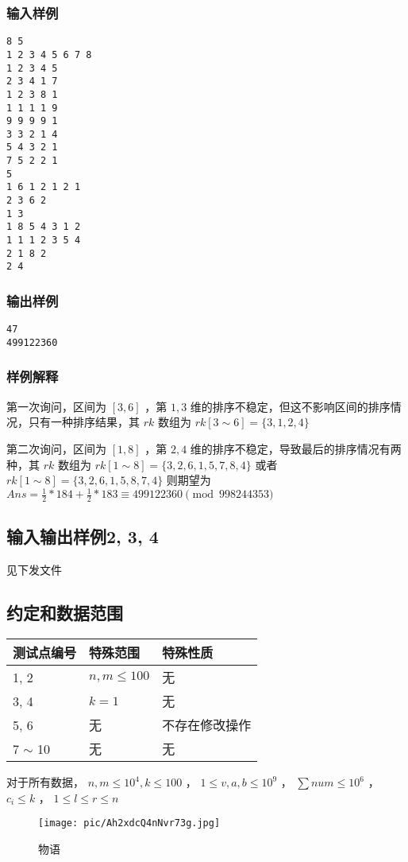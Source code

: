 \documentclass[UTF8]{ctexart}
\begin{document}
\subsubsection{输入样例}
\begin{verbatim}
8 5
1 2 3 4 5 6 7 8
1 2 3 4 5
2 3 4 1 7
1 2 3 8 1
1 1 1 1 9
9 9 9 9 1
3 3 2 1 4
5 4 3 2 1
7 5 2 2 1
5
1 6 1 2 1 2 1
2 3 6 2
1 3
1 8 5 4 3 1 2
1 1 1 2 3 5 4
2 1 8 2
2 4
\end{verbatim}
\subsubsection{输出样例}
\begin{verbatim}
47
499122360
\end{verbatim}
\subsubsection{样例解释}
第一次询问，区间为 $[3, 6]$ ，第 $1, 3$ 维的排序不稳定，但这不影响区间的排序情况，只有一种排序结果，其 $rk$ 数组为 $rk[3 \sim 6] = \{3, 1, 2, 4\}$ 

第二次询问，区间为 $[1, 8]$ ，第 $2, 4$ 维的排序不稳定，导致最后的排序情况有两种，其 $rk$ 数组为 $rk[1 \sim 8] = \{3, 2, 6, 1, 5, 7, 8, 4\}$ 或者 $rk[1 \sim 8] = \{3, 2, 6, 1, 5, 8, 7, 4\}$ 则期望为 $Ans = \frac{1}{2} * 184 + \frac{1}{2} * 183 \equiv 499122360 \pmod {998244353}$
\subsection{输入输出样例2, 3, 4}
见下发文件
\subsection{约定和数据范围}
\begin{center}
\begin{tabular}{*{3}{|C{9em}}|}
\hline
    测试点编号 & 特殊范围 & 特殊性质 \\ , 2 &$n, m \le 100$ & 无 \\ , 4 & $k = 1$ & 无  \\ , 6 & 无 & 不存在修改操作 \\  $\sim$ 10 & 无 & 无 \\ \hline
\end{tabular}
\end{center}
对于所有数据， $n, m \le 10^4, k \le 100$ ， $1 \le v, a, b \le 10^9$ ， $\sum num \le 10^6$ ， $c_i \le k$  ， $1 \le l \le r \le n$
\begin{figure}[h]
    \centering
    \texttt{[image: pic/Ah2xdcQ4nNvr73g.jpg]}
    \caption{物语}
    \label{fig:enter-label}
\end{figure}
\end{document}
